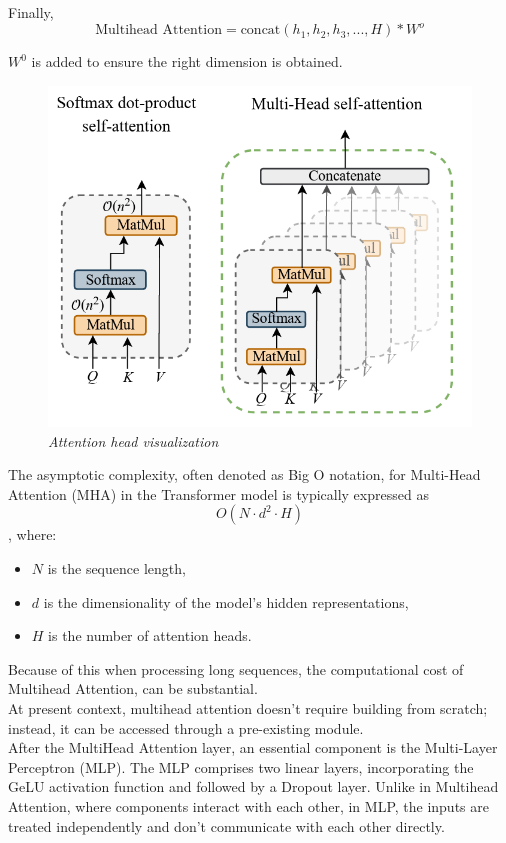 Finally, \[\text{Multihead Attention} = \text{concat} (h_1, h_2, h_3,...,H)* W^o \]

$W^0$ is added to ensure the right dimension is obtained.


\begin{figure}[htbp]
    \centering
    \includegraphics[width=5in]{img/Attentionfig.png}
    \caption{\textit{Attention head visualization}}
\end{figure}

The asymptotic complexity, often denoted as Big O notation, for Multi-Head Attention (MHA) in the Transformer model is typically expressed as\[ O(N \cdot d^2 \cdot H)\], where:
\begin{itemize}
    \item $N$ is the sequence length,
    \item $d$ is the dimensionality of the model's hidden representations,
    \item $H$ is the number of attention heads.
\end{itemize}
Because of this when processing long sequences, the computational cost of Multihead Attention, can be substantial.\\

At present context, multihead attention doesn't require building from scratch; instead, it can be accessed through a pre-existing module.\\

After the MultiHead Attention layer, an essential component is the Multi-Layer Perceptron (MLP). The MLP comprises two linear layers, incorporating the GeLU activation function and followed by a Dropout layer. Unlike in Multihead Attention, where components interact with each other, in MLP, the inputs are treated independently and don't communicate with each other directly.\\

